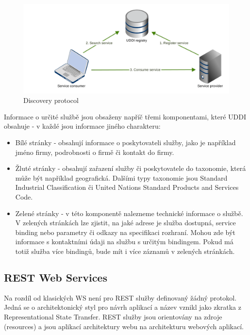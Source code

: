 \documentclass[11pt,twoside,a4paper]{book}
\begin{document}
\begin{figure}[h]
\begin{center}
\includegraphics[width=13cm]{images-pdf/uddi.pdf} 
\caption{Discovery protocol}
\label{fig:logo}
\end{center}
\end{figure}

Informace o určité službě jsou obsaženy napříč třemi komponentami, které UDDI obsahuje -
v každé jsou informace jiného charakteru:

\begin{itemize}
  \item Bílé stránky - obsahují informace o poskytovateli služby, jako je například jméno
firmy, podrobnosti o firmě či kontakt do firmy.

  \item Žluté stránky - obsahují zařazení služby či poskytovatele do taxonomie, která může
být například geografická. Dalšími typy taxonomie jsou Standard Industrial
Classification či United Nations Standard Products and Services Code.

  \item Zelené stránky - v této komponentě nalezneme technické informace o službě. V
zelených stránkách lze zjistit, na jaké adrese je služba dostupná, service binding nebo
parametry či odkazy na specifikaci rozhraní. Mohou zde být informace s kontaktními
údaji na službu s určitým bindingem. Pokud má totiž služba více bindingů, bude mít i
více záznamů v zelených stránkách.

\end{itemize}

\subsection{REST Web Services}

Na rozdíl od klasických WS není pro REST služby definovaný žádný protokol. Jedná
se o architektonický styl pro návrh aplikací a název vznikl jako zkratka z  Representational State Transfer. REST služby jsou orientovány na zdroje (resources) a jsou aplikací architektury webu na architekturu webových aplikací. 
\end{document}
